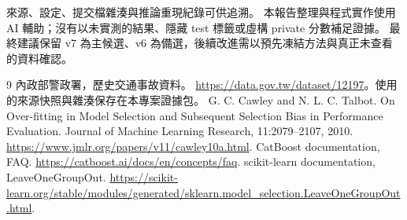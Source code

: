 \documentclass[11pt,a4paper]{article}
\begin{document}
來源、設定、提交檔雜湊與推論重現紀錄可供追溯。
本報告整理與程式實作使用 AI 輔助；沒有以未實測的結果、隱藏 test 標籤或虛構 private 分數補足證據。
最終建議保留 v7 為主候選、v6 為備選，後續改進需以預先凍結方法與真正未查看的資料確認。

\begin{thebibliography}{9}
 內政部警政署，歷史交通事故資料。
\url{https://data.gov.tw/dataset/12197}。使用的來源快照與雜湊保存在本專案證據包。
 G. C. Cawley and N. L. C. Talbot.
On Over-fitting in Model Selection and Subsequent Selection Bias in Performance Evaluation.
Journal of Machine Learning Research, 11:2079--2107, 2010.
\url{https://www.jmlr.org/papers/v11/cawley10a.html}.
 CatBoost documentation, FAQ.
\url{https://catboost.ai/docs/en/concepts/faq}.
 scikit-learn documentation, LeaveOneGroupOut.
\url{https://scikit-learn.org/stable/modules/generated/sklearn.model_selection.LeaveOneGroupOut.html}.
\end{thebibliography}
\end{document}
